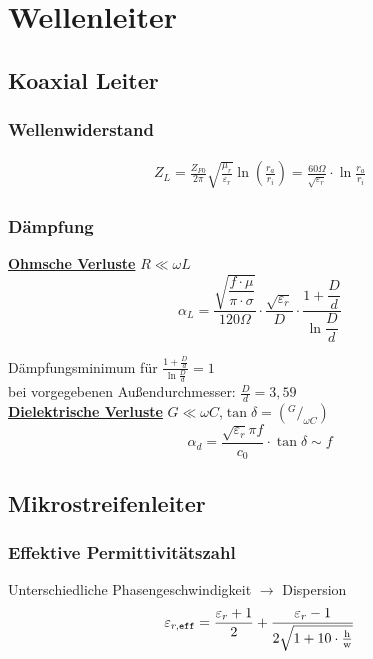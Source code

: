 \section{Wellenleiter}
\subsection{Koaxial Leiter}
\subsubsection{Wellenwiderstand}


\begin{align*}
    Z_L = \frac{Z_{F0}}{2\pi}\sqrt{\frac{\mu_r}{\varepsilon_r}}\ln\left( \frac{r_a}{r_i} \right)  =\frac{60\Omega}{\sqrt{\varepsilon_r}}\cdot \ln{\frac{r_a}{r_i}}
\end{align*}

\subsubsection{Dämpfung}
\underline{\textbf{Ohmsche Verluste}} $R\ll\omega L$
\[
    \alpha_L = \frac{\sqrt{\dfrac{f\cdot\mu}{\pi\cdot\sigma}}}{120\Omega}\cdot\frac{\sqrt{\varepsilon_r}}{D}\cdot\dfrac{1+\dfrac{D}{d}}{\ln \dfrac{D}{d}}
\]

Dämpfungsminimum für $ \frac{1+\tfrac{D}{d}}{\ln \tfrac{D}{d}} = 1 $\\ bei vorgegebenen Außendurchmesser: $ \frac{D}{d} =3,59 $\\

\underline{\textbf{Dielektrische Verluste}} $G\ll\omega C$,$\tan\delta= (^G/_{\omega C})$
\[
    \alpha_d = \frac{\sqrt{\varepsilon_r}\pi f}{c_0}\cdot\tan\delta \sim f
\]

\subsection{Mikrostreifenleiter}

\subsubsection{Effektive Permittivitätszahl}
Unterschiedliche Phasengeschwindigkeit $\rightarrow$ Dispersion
\[
         \varepsilon_{r,\texttt{eff}}  = \frac{\varepsilon_r+1}{2}+\frac{\varepsilon_r-1}{2\sqrt{1+10\cdot\frac{\text{h}}{\text{w}}}} \\
\]

